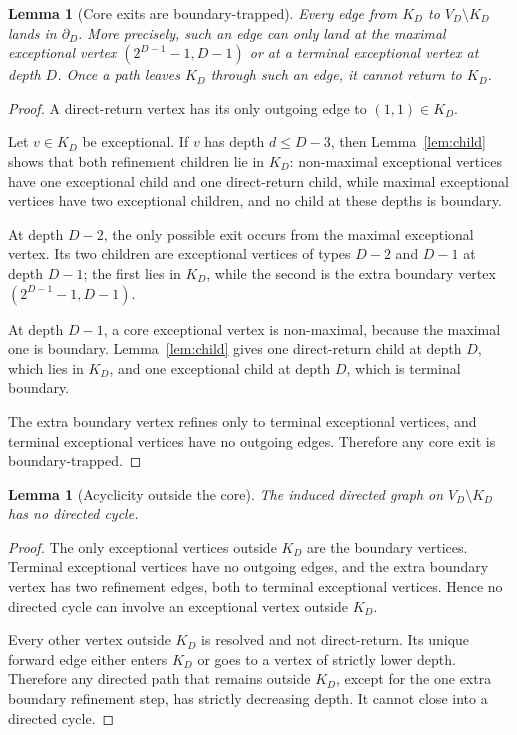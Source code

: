 \documentclass[11pt]{article}
\newtheorem{lemma}[theorem]{Lemma}
\theoremstyle{definition}
\theoremstyle{remark}
\newcommand{\bdD}{\partial_D}
\begin{document}
\begin{lemma}[Core exits are boundary-trapped]\label{lem:boundary-trapped}
Every edge from $K_D$ to $V_D\setminus K_D$ lands in $\bdD$.  More precisely, such an edge can only land at the maximal exceptional vertex $(2^{D-1}-1,D-1)$ or at a terminal exceptional vertex at depth $D$.  Once a path leaves $K_D$ through such an edge, it cannot return to $K_D$.
\end{lemma}

\begin{proof}
A direct-return vertex has its only outgoing edge to $(1,1)\in K_D$.

Let $v\in K_D$ be exceptional.  If $v$ has depth $d\le D-3$, then Lemma~\ref{lem:child} shows that both refinement children lie in $K_D$: non-maximal exceptional vertices have one exceptional child and one direct-return child, while maximal exceptional vertices have two exceptional children, and no child at these depths is boundary.

At depth $D-2$, the only possible exit occurs from the maximal exceptional vertex.  Its two children are exceptional vertices of types $D-2$ and $D-1$ at depth $D-1$; the first lies in $K_D$, while the second is the extra boundary vertex $(2^{D-1}-1,D-1)$.

At depth $D-1$, a core exceptional vertex is non-maximal, because the maximal one is boundary.  Lemma~\ref{lem:child} gives one direct-return child at depth $D$, which lies in $K_D$, and one exceptional child at depth $D$, which is terminal boundary.

The extra boundary vertex refines only to terminal exceptional vertices, and terminal exceptional vertices have no outgoing edges.  Therefore any core exit is boundary-trapped.
\end{proof}

\begin{lemma}[Acyclicity outside the core]\label{lem:acyclic-outside}
The induced directed graph on $V_D\setminus K_D$ has no directed cycle.
\end{lemma}

\begin{proof}
The only exceptional vertices outside $K_D$ are the boundary vertices.  Terminal exceptional vertices have no outgoing edges, and the extra boundary vertex has two refinement edges, both to terminal exceptional vertices.  Hence no directed cycle can involve an exceptional vertex outside $K_D$.

Every other vertex outside $K_D$ is resolved and not direct-return.  Its unique forward edge either enters $K_D$ or goes to a vertex of strictly lower depth.  Therefore any directed path that remains outside $K_D$, except for the one extra boundary refinement step, has strictly decreasing depth.  It cannot close into a directed cycle.
\end{proof}
\end{document}
